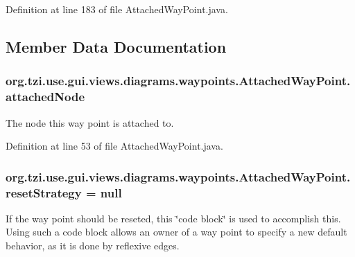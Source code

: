 Definition at line 183 of file Attached\-Way\-Point.\-java.



\subsection{Member Data Documentation}
\hypertarget{classorg_1_1tzi_1_1use_1_1gui_1_1views_1_1diagrams_1_1waypoints_1_1_attached_way_point_a4afc81c0c6490c31b7eb211e8521fb0a}{
\subsubsection[{attached\-Node}]{ org.\-tzi.\-use.\-gui.\-views.\-diagrams.\-waypoints.\-Attached\-Way\-Point.\-attached\-Node\hspace{0.3cm}{\ttfamily [protected]}}}\label{classorg_1_1tzi_1_1use_1_1gui_1_1views_1_1diagrams_1_1waypoints_1_1_attached_way_point_a4afc81c0c6490c31b7eb211e8521fb0a}
The node this way point is attached to. 

Definition at line 53 of file Attached\-Way\-Point.\-java.

\hypertarget{classorg_1_1tzi_1_1use_1_1gui_1_1views_1_1diagrams_1_1waypoints_1_1_attached_way_point_a8ab029b32be4c20c32907138e43076fe}{
\subsubsection[{reset\-Strategy}]{ org.\-tzi.\-use.\-gui.\-views.\-diagrams.\-waypoints.\-Attached\-Way\-Point.\-reset\-Strategy = null\hspace{0.3cm}{\ttfamily [protected]}}}\label{classorg_1_1tzi_1_1use_1_1gui_1_1views_1_1diagrams_1_1waypoints_1_1_attached_way_point_a8ab029b32be4c20c32907138e43076fe}
If the way point should be reseted, this \char`\"{}code block\char`\"{} is used to accomplish this. Using such a code block allows an owner of a way point to specify a new default behavior, as it is done by reflexive edges. 

